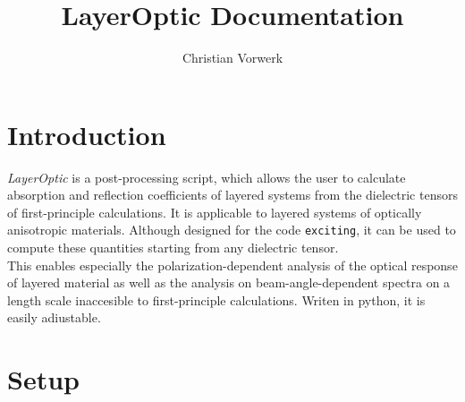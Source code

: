 \documentclass[11pt]{article}
\title{LayerOptic Documentation}
\author{Christian Vorwerk}
\begin{document}
\maketitle



\section{Introduction}
\textit{LayerOptic} is a post-processing script, which allows the user to calculate absorption and reflection coefficients of layered systems from the dielectric tensors of first-principle calculations.
It is applicable to layered systems of optically anisotropic materials.
Although designed for the code \texttt{exciting}, it can be used to compute these quantities starting from any dielectric tensor.\\
This enables especially the polarization-dependent analysis of the optical response of layered material as well as the analysis on beam-angle-dependent spectra on a length scale inaccesible to first-principle calculations. Writen in python, it is easily adiustable.
\section{Setup}
\end{document}
